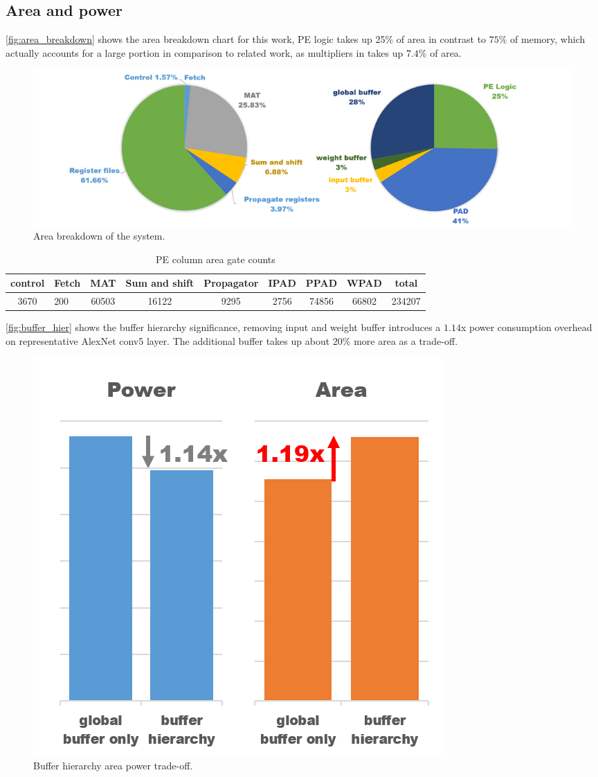 \subsection{Area and power}
\autoref{fig:area_breakdown} shows the area breakdown chart for this work, PE logic takes up 25\% of area in contrast to $75\%$ of memory, which actually accounts for a large portion in comparison to related work, as multipliers in \cite{Eyeriss} takes up $7.4\%$ of area. 
\begin{figure}[h]
    \centering
    \includegraphics[width=1\linewidth]{inc/5_results/figure/area_breakdown.png}
    \caption{Area breakdown of the system.}
    \label{fig:area_breakdown}
\end{figure}
\begin{table}[h]
    \caption{PE column area gate counts}
    \label{tab:area_gate}
    \centering
    \footnotesize 
        \begin{tabular}{clccccccc}
        \toprule
        control  & Fetch  & MAT       & Sum and shift       & Propagator      & IPAD     & PPAD     & WPAD    & total       \\
        \midrule
        3670 & 200 & 60503 & 16122 & 9295 & 2756 & 74856 & 66802 & 234207\\
        \bottomrule
        \end{tabular}
\end{table}
\autoref{fig:buffer_hier} shows the buffer hierarchy significance, removing input and weight buffer introduces a $1.14$x power consumption overhead on representative AlexNet conv5 layer. The additional buffer takes up about $20\%$ more area as a trade-off. 
\begin{figure}[h]
    \centering
    \includegraphics[width=0.6\linewidth]{inc/5_results/figure/buffer_hier.png}
    \caption{Buffer hierarchy area power trade-off.}
    \label{fig:buffer_hier}
\end{figure}
